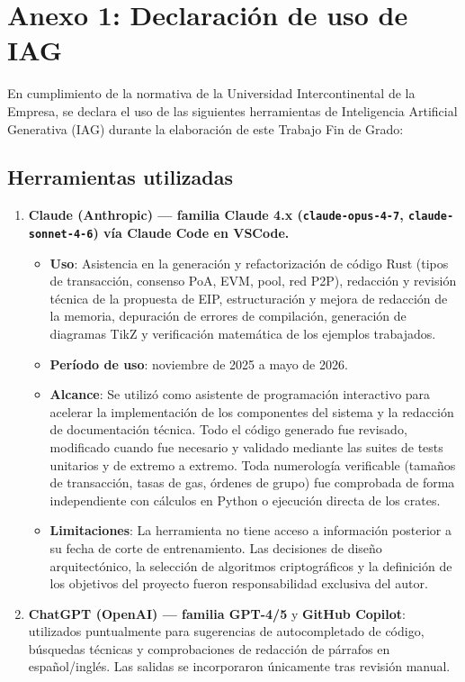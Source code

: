 \section{Anexo 1: Declaración de uso de IAG}
\label{sec:anexo_iag}

En cumplimiento de la normativa de la Universidad Intercontinental de la Empresa, se declara el uso de las siguientes herramientas de Inteligencia Artificial Generativa (IAG) durante la elaboración de este Trabajo Fin de Grado:

\subsection*{Herramientas utilizadas}

\begin{enumerate}
  \item \textbf{Claude (Anthropic) --- familia Claude 4.x (\texttt{claude-opus-4-7}, \texttt{claude-sonnet-4-6}) vía Claude Code en VSCode.}
  \begin{itemize}
    \item \textbf{Uso}: Asistencia en la generación y refactorización de código Rust (tipos de transacción, consenso PoA, EVM, pool, red P2P), redacción y revisión técnica de la propuesta de EIP, estructuración y mejora de redacción de la memoria, depuración de errores de compilación, generación de diagramas TikZ y verificación matemática de los ejemplos trabajados.
    \item \textbf{Período de uso}: noviembre de 2025 a mayo de 2026.
    \item \textbf{Alcance}: Se utilizó como asistente de programación interactivo para acelerar la implementación de los componentes del sistema y la redacción de documentación técnica. Todo el código generado fue revisado, modificado cuando fue necesario y validado mediante las suites de tests unitarios y de extremo a extremo. Toda numerología verificable (tamaños de transacción, tasas de gas, órdenes de grupo) fue comprobada de forma independiente con cálculos en Python o ejecución directa de los crates.
    \item \textbf{Limitaciones}: La herramienta no tiene acceso a información posterior a su fecha de corte de entrenamiento. Las decisiones de diseño arquitectónico, la selección de algoritmos criptográficos y la definición de los objetivos del proyecto fueron responsabilidad exclusiva del autor.
  \end{itemize}

  \item \textbf{ChatGPT (OpenAI) --- familia GPT-4/5} y \textbf{GitHub Copilot}: utilizados puntualmente para sugerencias de autocompletado de código, búsquedas técnicas y comprobaciones de redacción de párrafos en español/inglés. Las salidas se incorporaron únicamente tras revisión manual.
\end{enumerate}

